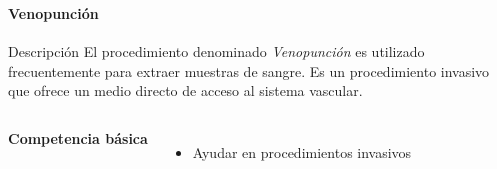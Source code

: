 \begin{frame}
    \frametitle{\pagetitle}
    \framesubtitle{Venopunción}

    \pause{}
    
    \begin{block}{Descripción}
    \centering
    El procedimiento denominado \emph{Venopunción} es utilizado
    frecuentemente para extraer muestras de sangre. Es un procedimiento invasivo
    que ofrece un medio directo de acceso al sistema vascular. 
    \end{block}

	\begin{columns}
	 \hspace{0.5cm}
    \centering
    
     \hspace{0.5cm}
    \textbf{Competencia básica}
    \begin{itemize}
	\item Ayudar en procedimientos invasivos
	\end{itemize}
	\end{columns}

\end{frame}

